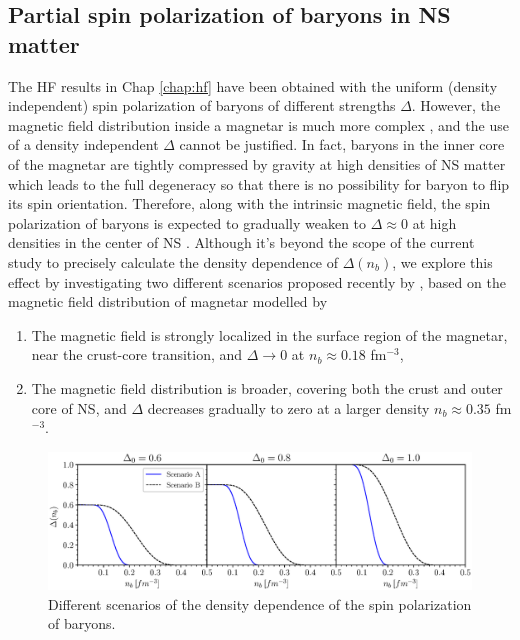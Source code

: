 \subsection*{Partial spin polarization of baryons in NS matter}
The \gls{HF} results in Chap \ref{chap:hf} have been obtained with the uniform (density independent)  
spin polarization of baryons of different strengths $\Delta$. However, the magnetic 
field distribution inside a magnetar is much more complex \citep{fujisawa2014magnetic}, 
and the use of a density independent $\Delta$ cannot be justified. In fact, baryons in the 
inner core of the magnetar are tightly compressed by gravity at high densities of \gls{NS} matter
which leads to the full degeneracy so that there is no possibility for baryon to flip 
its spin orientation. Therefore, along with the intrinsic magnetic field, the spin 
polarization of baryons is expected to gradually weaken to $\Delta \approx 0$ at high
densities in the center of \gls{NS} \citep{fujisawa2014magnetic,tan2020spin}. Although it's beyond 
the scope of the current study to precisely calculate the density dependence of $\Delta(n_b)$, 
we explore this effect by investigating two different scenarios proposed recently by
\cite{tan2020spin}, based on the magnetic field distribution of magnetar modelled by 
\cite{fujisawa2014magnetic}
\begin{enumerate}[label=(\Alph*)]
    \item The magnetic field is strongly localized in the surface region of the magnetar, 
		near the crust-core transition, and $\Delta\to 0$ at $n_b\approx 0.18$ fm$^{-3}$,
    \item The magnetic field distribution is broader, covering both the crust and outer 
        core of \gls{NS}, and $\Delta$ decreases gradually to zero at a larger density 
		$n_b \approx 0.35$ fm$^{-3}$. 
\end{enumerate}
\begin{figure}[ht!]
    \centering
    \includegraphics[width=\textwidth]{fig/Delta.eps}
    \caption{Different scenarios of the density dependence of the spin polarization 
		of baryons.}
    \label{fig:Delta}
\end{figure} 
